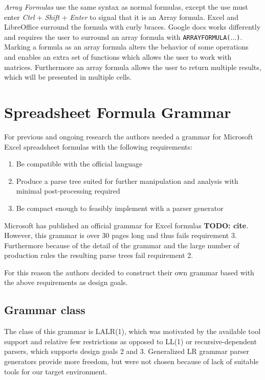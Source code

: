 \documentclass[conference]{IEEEtran}
\newcommand{\todo}[1]{\textbf{TODO: #1}}
\begin{document}
\emph{Array Formulas} use the same syntax as normal formulas, except the use must enter \emph{Ctrl} + \emph{Shift} + \emph{Enter} to signal that it is an Array formula.
Excel and LibreOffice surround the formula with curly braces.
Google docs works differently and requires the user to surround an array formula with \texttt{ARRAYFORMULA($\ldots$)}.
Marking a formula as an array formula alters the behavior of some operations and enables an extra set of functions which allows the user to work with matrices.
Furthermore an array formula allows the user to return multiple results, which will be presented in multiple cells.

\section{Spreadsheet Formula Grammar}
\label{section:grammar}

For previous and ongoing research the authors needed a grammar for Microsoft Excel spreadsheet formulas with the following requirements:

\begin{enumerate}
\item Be compatible with the official language
\item Produce a parse tree suited for further manipulation and analysis with minimal post-processing required
\item Be compact enough to feasibly implement with a parser generator
\end{enumerate}

Microsoft has published an official grammar for Excel formulas \todo{cite}.
However, this grammar is over 30 pages long and thus fails requirement 3.
Furthermore because of the detail of the grammar and the large number of production rules the resulting parse trees fail requirement 2.

For this reason the authors decided to construct their own grammar based with the above requirements as design goals.

\subsection{Grammar class}

The class of this grammar is LALR(1), which was motivated by the available tool support and relative few restrictions as opposed to LL(1) or recursive-dependent parsers, which supports design goals 2 and 3.
Generalized LR grammar parser generators provide more freedom, but were not chosen because of lack of suitable tools for our target environment.
\end{document}

